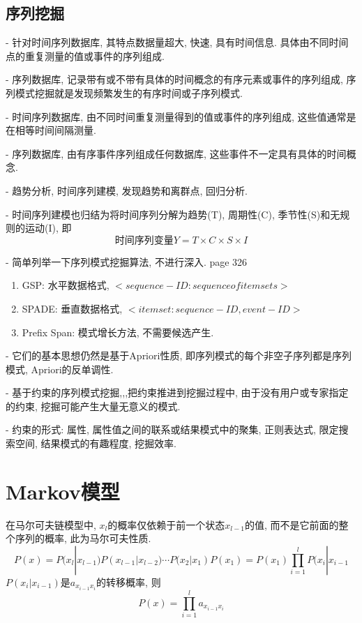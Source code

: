 \documentclass[a4paper,10pt,english]{article}
\begin{document}
\subsection {序列挖掘}
\begin{description}
\item {-}
\small{
针对时间序列数据库, 其特点数据量超大, 快速, 具有时间信息. 具体由不同时间点的重复测量的值或事件的序列组成. 
}
\item {-}
\small{
序列数据库, 记录带有或不带有具体的时间概念的有序元素或事件的序列组成, 序列模式挖掘就是发现频繁发生的有序时间或子序列模式.
}
\item {-}
\small{
时间序列数据库, 由不同时间重复测量得到的值或事件的序列组成, 这些值通常是在相等时间间隔测量. 
}
\item {-}
\small{
序列数据库, 由有序事件序列组成任何数据库, 这些事件不一定具有具体的时间概念. 
}
\item {-}
\small{
趋势分析, 时间序列建模, 发现趋势和离群点, 回归分析.
}
\item {-}
\small{
时间序列建模也归结为将时间序列分解为趋势(T), 周期性(C), 季节性(S)和无规则的运动(I), 即
$$ \mbox{时间序列变量}Y = T \times C \times S \times I$$ 
}
\item {-}
\small{
简单列举一下序列模式挖掘算法, 不进行深入. page 326
}
\end{description}
\begin{enumerate}
\item {GSP: }
水平数据格式, $<sequence-ID: sequence of itemsets>$
\item {SPADE: }
垂直数据格式, $<itemset: sequence-ID, event-ID>$
\item {Prefix Span: }
模式增长方法, 不需要候选产生.
\end{enumerate}
\begin{description}
\item {-}
\small{
它们的基本思想仍然是基于Apriori性质, 即序列模式的每个非空子序列都是序列模式, Apriori的反单调性.
}
\item {-}
\small{
基于约束的序列模式挖掘,,,把约束推进到挖掘过程中, 由于没有用户或专家指定的约束, 挖掘可能产生大量无意义的模式.
}
\item {-}
\small{
约束的形式: 属性, 属性值之间的联系或结果模式中的聚集, 正则表达式, 限定搜索空间, 结果模式的有趣程度, 挖掘效率.
}
\end{description}


\clearpage
\section {Markov模型}
在马尔可夫链模型中, $x_l$的概率仅依赖于前一个状态$x_{l-1}$的值, 而不是它前面的整个序列的概率, 此为马尔可夫性质.
$$ P(x) = P(x_l | x_{l-1})P(x_{l-1} | x_{l-2}) \cdots P(x_2 | x_1)P(x_1) = P(x_1) \prod_{i=1}^lP(x_i|x_{i-1} $$
$P(x_i|x_{i-1})$是$a_{x_{i-1}x_i}$的转移概率, 则
$$ P(x) = \prod_{i=1}^la_{x_{i-1}x_i} $$
\end{document}
